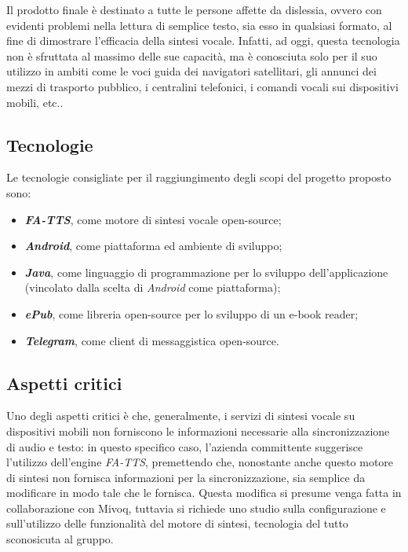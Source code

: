 Il prodotto finale è destinato a tutte le persone affette da dislessia, ovvero con evidenti problemi nella lettura di semplice testo, sia esso in qualsiasi formato, al fine di dimostrare l'efficacia della sintesi vocale. Infatti, ad oggi, questa tecnologia non è sfruttata al massimo delle sue capacità, ma è conosciuta solo per il suo utilizzo
in ambiti come le voci guida dei navigatori satellitari, gli annunci dei mezzi di trasporto pubblico, i centralini telefonici, i comandi vocali sui dispositivi mobili, etc..

\subsection{Tecnologie}

Le tecnologie consigliate per il raggiungimento degli scopi del progetto proposto sono:
\begin{itemize}
	\item \textbf{\textit{FA-TTS}},
	come motore di sintesi vocale open-source;
	\item \textbf{\textit{Android}}, come piattaforma ed ambiente di sviluppo;
	\item \textbf{\textit{Java}}, come linguaggio di programmazione per lo sviluppo dell'applicazione
	(vincolato dalla scelta di \textit{Android} come piattaforma);
	\item \textbf{\textit{ePub}}, come libreria open-source per lo sviluppo di un e-book
	reader;
	\item \textbf{\textit{Telegram}}, come client di messaggistica open-source.
\end{itemize}

\subsection{Aspetti critici}

Uno degli aspetti critici è che, generalmente, i servizi di sintesi vocale su dispositivi mobili non forniscono le informazioni necessarie
alla sincronizzazione di audio e testo: in questo specifico caso,
l'azienda committente suggerisce l'utilizzo dell'engine \textit{FA-TTS},
premettendo che, nonostante anche questo motore di sintesi non fornisca
informazioni per la sincronizzazione, sia semplice da modificare in
modo tale che le fornisca. Questa modifica si presume venga fatta in collaborazione con Mivoq,
tuttavia si richiede uno studio sulla configurazione e sull'utilizzo delle funzionalità del motore di sintesi, tecnologia del tutto sconosicuta al gruppo. 

